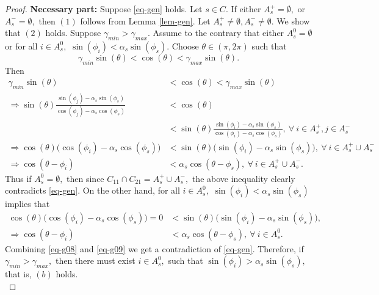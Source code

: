 \documentclass{amsart}
\theoremstyle{definition}
\theoremstyle{remark}
\numberwithin{equation}{section}
\begin{document}
	\begin{proof}
		\textbf{Necessary part:} Suppose \eqref{eq-gen} holds. Let $s\in C.$ If either $A_s^+= \emptyset, $ or $A_s^-= \emptyset,$ then $(1)$ follows from Lemma \ref{lem-gen}.  Let $A_s^+\neq \emptyset, A_s^-\neq \emptyset.$ We show that $(2)$ holds. Suppose  $\gamma_{min}>\gamma_{max}.$ Assume to the contrary that either $A_s^0=\emptyset$ or for all $i\in A_s^0,$ $\sin(\phi_i)<\alpha_s\sin(\phi_s).$ Choose $\theta \in (\pi,2\pi)$ such that 
		\[\gamma_{min}\sin(\theta)<\cos(\theta)<\gamma_{max}\sin(\theta).\]
		Then 
		\begin{equation}\label{eq-g08}
			\begin{split}
				\gamma_{min}\sin(\theta)	&<\cos(\theta)<\gamma_{max}\sin(\theta)\\
				\Rightarrow \sin(\theta) \frac{\sin(\phi_j)-\alpha_s \sin(\phi_s)}{\cos(\phi_j)-\alpha_s \cos(\phi_s)} &<	\cos(\theta)\\
				&<\sin(\theta) \frac{\sin(\phi_i)-\alpha_s \sin(\phi_s)}{\cos(\phi_i)-\alpha_s \cos(\phi_s)}, ~\forall ~i\in A_s^+, j\in A_s^-\\
				\Rightarrow 	\cos(\theta)\Big(\cos(\phi_i)-\alpha_s \cos(\phi_s)\Big)&<\sin(\theta) \Big(\sin(\phi_i)-\alpha_s \sin(\phi_s)\Big), ~\forall ~i\in A_s^+\cup A_s^-\\
				\Rightarrow \cos(\theta-\phi_i)&<\alpha_s \cos(\theta-\phi_s), ~\forall ~i\in A_s^+\cup A_s^-.
			\end{split}
		\end{equation}
		Thus if $A_s^0=\emptyset,$ then since $C_{11}\cap C_{21}=A_s^+\cup A_s^-,$ the above inequality clearly contradicts \eqref{eq-gen}. On the other hand, for all $i\in A_s^0,$ $\sin(\phi_i)<\alpha_s\sin(\phi_s)$ implies that 
		\begin{equation}\label{eq-g09}
			\begin{split}
				\cos(\theta)\Big(\cos(\phi_i)-\alpha_s\cos(\phi_s)\Big)=0&<\sin(\theta) \Big(\sin(\phi_i)-\alpha_s \sin(\phi_s)\Big), \\
				\Rightarrow \cos(\theta-\phi_i)&<\alpha_s \cos(\theta-\phi_s), ~\forall ~i\in A_s^0.
			\end{split}
		\end{equation}
		Combining \eqref{eq-g08} and \eqref{eq-g09} we get a contradiction of \eqref{eq-gen}. Therefore, if $\gamma_{min}>\gamma_{max},$ then there must exist $i\in A_s^0,$ such that  $\sin(\phi_i)>\alpha_s\sin(\phi_s),$ that is, $(b)$ holds.\\
		

\end{proof}
\end{document}
